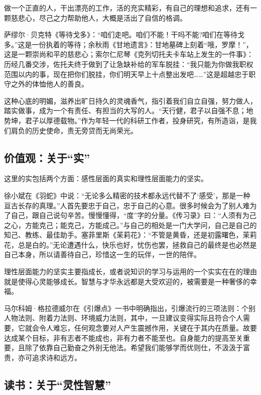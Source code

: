 \documentclass[openany,scheme = chinese, linespread = 1.5]{ctexbook}
\begin{document}
做一个正直的人，干出漂亮的工作，活的充实精彩，有自己的理想和追求，还有一颗慈悲心，尽己之力帮助他人，大概是活出了自信的格调。

萨缪尔·贝克特《等待戈多》：“咱们走吧。咱们不能！干吗不能?咱们在等待戈多。”这是一份执着的等待；余秋雨《甘地遗言》：甘地墓碑上刻着“哦，罗摩！”，这是一颗崇尚和平的慈悲心；索尔仁尼琴《克列切托夫卡车站上发生的一件事》：历经几番交涉，佐托夫终于做到了让急缺补给的军车脱挂：“我只能为你做我职权范围以内的事，现在把你们脱挂，你们明天早上十点整出发吧……”这是超越忠于职守之外的体恤他人的善良。

这种心底的明媚，滋养出旷日持久的灵魂香气，指引着我们自立自强，努力做人，踏实做事，成为一个有责任、有担当的大写的人。“天行健，君子以自强不息；地势坤，君子以厚德载物。”作为年轻一代的科研工作者，投身研究，有所造诣，是我们肩负的历史使命，责无旁贷而无尚荣光。

\subsection*{价值观：关于“实”}

这里的实包括两个方面：感性层面的真实和理性层面能力的坚实。

    徐小斌在《羽蛇》中说：“无论多么精密的技术都永远代替不了‘感受’，那是一种亘古长存的真理。”人首先要忠于自己，忠于自己的心意。很多时候会为了别人难为了自己，跟自己说句辛苦。慢慢懂得，“度”字的分量。《传习录》曰：“人须有为己之心，方能克己；能克己，方能成己。”与自己的相处是一门大学问，自己是自己的知己、教练、最佳助手。塞菲里斯《茉莉花》：“不管是黄昏，还是初露曙色，茉莉花，总是白的。”无论遭遇什么，快乐也好，忧伤也罢，拯救自己的最终是也必然是自己本身，所以请善待自己，珍惜这一生的玩伴，一世的陪伴。
    
    理性层面能力的坚实主要指成长，或者说知识的学习与运用的一个实实在在的理由就是使得心灵能够成长。智慧与才华永远都是大受欢迎的，被需要是一种奢侈的幸福。
    
马尔科姆·格拉德威尔在《引爆点》一书中明确指出，引爆流行的三项法则：个别人物法则、附着力法则、环境威力法则，其中，一旦建议变得实际且符合个人需要，它就会令人难忘，任何观念要对人产生震撼作用，关键在于其内在质量。故要达成某个目标，非有志者不能成也，非有力者不能至也。自身能力的提高至关重要，且除了依靠自己勤奋之外别无他法。希望我们能够学而优则仕，不汲汲于富贵，亦可追求诗和远方。

\subsection*{读书：关于“灵性智慧”}
\end{document}
